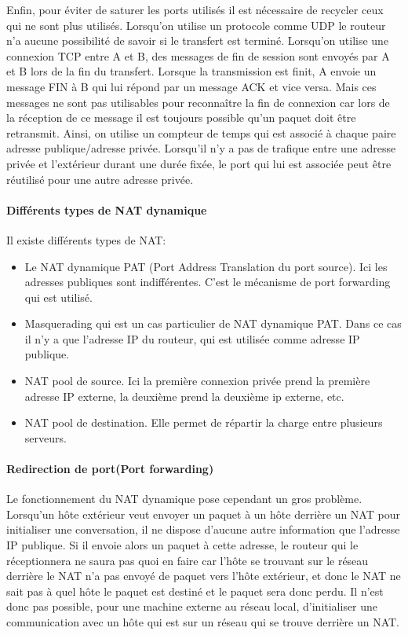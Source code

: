 Enfin, pour éviter de saturer les ports utilisés il est nécessaire de recycler
 ceux qui ne sont plus utilisés. Lorsqu'on utilise un protocole comme UDP le
routeur n'a aucune possibilité de savoir si le transfert est terminé. Lorsqu'on
utilise une connexion TCP entre A et B, des messages de fin de session sont
envoyés par A et B lors de la fin du transfert. Lorsque la transmission est
finit, A envoie un message FIN à B qui lui répond par un message ACK et vice
versa. Mais ces messages ne sont pas utilisables pour reconnaître la fin de
connexion car lors de la réception de ce message il est toujours possible qu'un
paquet doit être retransmit. Ainsi, on utilise un compteur de temps qui est
associé à chaque paire adresse publique/adresse privée. Lorsqu'il n'y a pas de
trafique entre une adresse privée et l'extérieur durant une durée fixée, le port
qui lui est associée peut être réutilisé pour une autre adresse privée.

\paragraph{Différents types de NAT dynamique}

Il existe différents types de NAT:
\begin{itemize}
\item Le NAT dynamique PAT (Port Address Translation du port source). Ici les
adresses publiques sont indifférentes. C'est le mécanisme de port forwarding qui est utilisé.
\item Masquerading qui est un cas particulier de NAT dynamique PAT. Dans ce cas il n'y a que l'adresse IP du routeur, qui est utilisée comme adresse IP publique.
\item NAT pool de source. Ici la première connexion privée prend la première
adresse IP externe, la deuxième prend la deuxième ip externe, etc.
\item NAT pool de destination. Elle permet de répartir la charge entre plusieurs
serveurs.
\end{itemize}


\paragraph{Redirection de port(Port forwarding)}

Le fonctionnement du NAT dynamique pose cependant un gros problème. Lorsqu'un hôte
extérieur veut envoyer un paquet à un hôte derrière un NAT pour initialiser une conversation, il ne dispose
d'aucune autre information que l'adresse IP publique. Si il envoie alors un
paquet à cette adresse, le routeur qui le réceptionnera ne saura pas quoi en
faire car l'hôte se trouvant sur le réseau derrière le NAT n'a pas envoyé de paquet vers l'hôte extérieur, et donc le NAT ne sait pas à quel hôte le paquet est destiné et le paquet sera
donc perdu. Il n'est donc pas possible, pour une machine externe au réseau local, d'initialiser
une communication avec un hôte qui est sur un réseau qui se trouve derrière un NAT.

